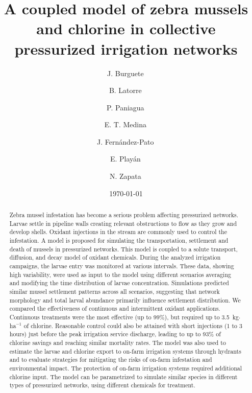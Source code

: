 \documentclass[review,authoryear]{elsarticle}
\begin{document}
\begin{frontmatter}

\title{A coupled model of zebra mussels and chlorine in collective pressurized
	irrigation networks}

\author[1]{J. Burguete\,}

\author[1]{B. Latorre\,}

\author[1]{P. Paniagua\,}

\author[1]{E. T. Medina\,}

\author[1]{J. Fernández-Pato\,}

\author[1]{E. Playán\,}

\author[1]{N. Zapata\,}


\date{\today}

\begin{abstract}
Zebra mussel infestation has become a serious problem affecting pressurized
networks. Larvae settle in pipeline walls creating relevant obstructions to flow
as they grow and develop shells. Oxidant injections in the stream are commonly
used to control the infestation. A model is proposed for simulating the
transportation, settlement and death of mussels in pressurized networks. This
model is coupled to a solute transport, diffusion, and decay model of oxidant
chemicals. During the analyzed irrigation campaigns, the larvae entry was
monitored at various intervals. These data, showing high variability, were used
as input to the model using different scenarios averaging and modifying the time
distribution of larvae concentration. Simulations predicted similar mussel
settlement patterns across all scenarios, suggesting that network morphology and
total larval abundance primarily influence settlement distribution. We compared
the effectiveness of continuous and intermittent oxidant applications.
Continuous treatments were the most effective (up to 99\%), but required up to
3.5~kg$\cdot$ha$^{-1}$ of chlorine. Reasonable control could also be attained
with short injections (1 to 3 hours) just before the peak irrigation service
discharge, leading to up to 93\% of chlorine savings and reaching similar
mortality rates. The model was also used to estimate the larvae and chlorine
export to on-farm irrigation systems through hydrants and to evaluate strategies
for mitigating the risks of on-farm infestation and environmental impact. The
protection of on-farm irrigation systems required additional chlorine input. The
model can be parametrized to simulate similar species in different types of
pressurized networks, using different chemicals for treatment.
\end{abstract}


\end{frontmatter}
\end{document}
